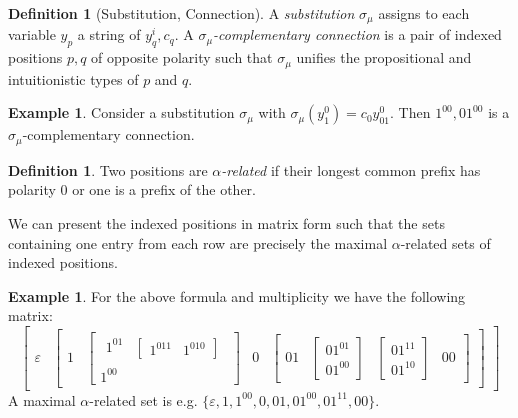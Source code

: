 \documentclass[11pt]{article}
\theoremstyle{definition}
\theoremstyle{definition}
\theoremstyle{definition}
\theoremstyle{definition}
\theoremstyle{definition}
\newtheorem{definition}[theorem]{Definition}
\theoremstyle{definition}
\newtheorem{example}[theorem]{Example}
\theoremstyle{definition}
\begin{document}
	\begin{definition}[Substitution, Connection]
		A \emph{substitution} $\sigma_\mu$ assigns to each variable $y_p$ a string of $y_q^i, c_q$. A \emph{$\sigma_\mu$-complementary connection} is a pair of indexed positions $p, q$ of opposite polarity such that $\sigma_\mu$ unifies the propositional and intuitionistic types of $p$ and $q$.
	\end{definition}

	\begin{example}
		Consider a substitution $\sigma_\mu$ with $\sigma_\mu(y_1^0) = c_0y_{01}^0$. Then $1^00, 01^00$ is a $\sigma_\mu$-complementary connection.
	\end{example}

	\begin{definition}
		Two positions are \emph{$\alpha$-related} if their longest common prefix has polarity $0$ or one is a prefix of the other.
	\end{definition}

	We can present the indexed positions in matrix form such that the sets containing one entry from each row are precisely the maximal $\alpha$-related sets of indexed positions.

	\begin{example}
		For the above formula and multiplicity we have the following matrix:
		\[
		\begin{bmatrix}
			\varepsilon &
			\begin{bmatrix}
				1 &
				\begin{bmatrix}
					\begin{matrix}
						1^01 & \begin{bmatrix}
							1^011 & 1^010
						\end{bmatrix}
					\end{matrix} \\ 1^00
				\end{bmatrix} &
				0 &
				\begin{bmatrix}
					01 &
					\begin{bmatrix}
						01^01 \\ 01^00
					\end{bmatrix} &
					\begin{bmatrix}
						01^11 \\ 01^10
					\end{bmatrix} &
					00
				\end{bmatrix}
			\end{bmatrix}
		\end{bmatrix}
		\]
	A maximal $\alpha$-related set is e.g. $\{\varepsilon, 1, 1^00, 0, 01, 01^00, 01^11, 00\}$.
	\end{example}
\end{document}
